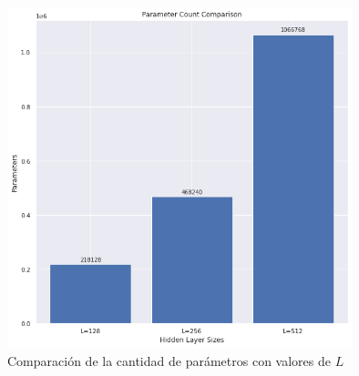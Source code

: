 \documentclass [a4paper,12pt,oneside,final]{article}
\begin{document}
\begin{figure}[ht]
  \centering
  \includegraphics[width=10cm,keepaspectratio]{./graficos/parameters_comparison.png}
  \caption{Comparación de la cantidad de parámetros con valores de $L$}\label{fig:parameters_comparison}
\end{figure}
\end{document}
